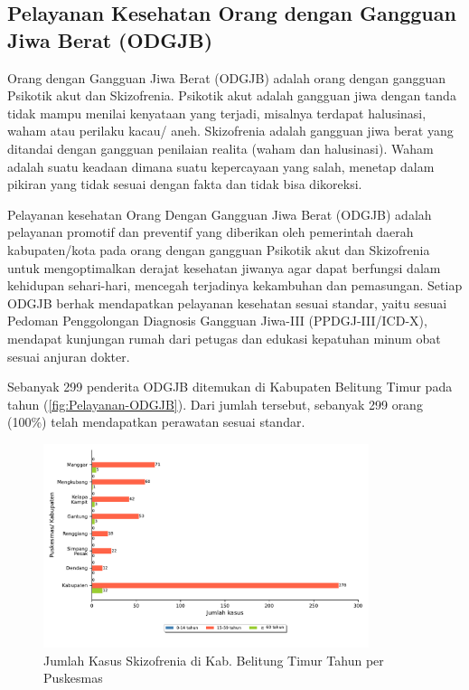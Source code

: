 \subsection{Pelayanan Kesehatan Orang dengan Gangguan Jiwa Berat (ODGJB)}
Orang dengan Gangguan Jiwa Berat (ODGJB) adalah orang dengan gangguan Psikotik akut dan Skizofrenia.
Psikotik akut adalah gangguan jiwa dengan tanda tidak mampu menilai kenyataan yang terjadi, misalnya terdapat halusinasi, waham atau perilaku kacau/ aneh.
Skizofrenia adalah gangguan jiwa berat yang ditandai dengan gangguan penilaian realita (waham dan halusinasi).
Waham adalah suatu keadaan dimana suatu kepercayaan yang salah, menetap dalam pikiran yang tidak sesuai dengan fakta dan tidak bisa dikoreksi.

Pelayanan kesehatan Orang Dengan Gangguan Jiwa Berat (ODGJB) adalah pelayanan promotif dan preventif yang diberikan oleh pemerintah daerah kabupaten/kota pada orang dengan gangguan Psikotik akut dan Skizofrenia untuk mengoptimalkan derajat kesehatan jiwanya agar dapat berfungsi dalam kehidupan sehari-hari, mencegah terjadinya kekambuhan dan pemasungan.
Setiap ODGJB berhak mendapatkan pelayanan kesehatan sesuai standar, yaitu sesuai Pedoman Penggolongan Diagnosis Gangguan Jiwa-III (PPDGJ-III/ICD-X), mendapat kunjungan rumah dari petugas dan edukasi kepatuhan minum obat sesuai anjuran dokter.

Sebanyak 299 penderita ODGJB ditemukan di Kabupaten Belitung Timur pada tahun \tP (\autoref{fig:Pelayanan-ODGJB}).
Dari jumlah tersebut, sebanyak 299 orang (100\%) telah mendapatkan perawatan sesuai standar.

\begin{figure}[H]
	\centering
	\includegraphics[width=0.85\textwidth]{bab_06/bab_06_16a_skizofrenia}
	\caption{Jumlah Kasus Skizofrenia di Kab. Belitung Timur Tahun \tP per Puskesmas}
	\label{fig:Kasus-Skizofrenia}
\end{figure}

